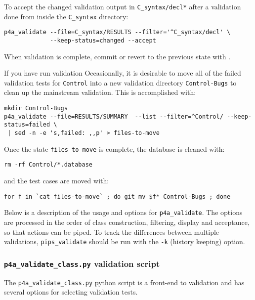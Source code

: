 \documentclass[a4paper]{article}
\begin{document}
To accept the changed validation output in \texttt{C\_syntax/decl\emph{*}}
after a validation done from inside the \verb|C_syntax| directory:
\begin{verbatim}
p4a_validate --file=C_syntax/RESULTS --filter='^C_syntax/decl' \
             --keep-status=changed --accept
\end{verbatim}
When validation is complete, commit or revert to the previous state with \Agit.

If you have run validation
Occasionally, it is desirable to move all of the failed validation tests for
\texttt{Control} into a new validation directory \texttt{Control-Bugs} to
clean up the mainstream validation. This is accomplished with:
\begin{verbatim}
mkdir Control-Bugs
p4a_validate --file=RESULTS/SUMMARY  --list --filter=^Control/ --keep-status=failed \
 | sed -n -e 's,failed: ,,p' > files-to-move
\end{verbatim}
Once the state \texttt{files-to-move} is complete, the database is
cleaned with:
\begin{verbatim}
rm -rf Control/*.database
\end{verbatim}
and the test cases are moved with:
\begin{verbatim}
for f in `cat files-to-move` ; do git mv $f* Control-Bugs ; done
\end{verbatim}


\label{sec:opti-list-p4a_v-1}

Below is a description of the usage and options for
\verb|p4a_validate|. The options are processed in the order of class
construction, filtering, display and acceptance, so that
actions can be piped. To track the differences between
multiple validations, \verb|pips_validate| should be run with the
\texttt{-k} (history keeping) option.




\subsubsection{\texttt{p4a\_validate\_class.py} validation script}
\label{sec:validation_script}

The \verb|p4a_validate_class.py| python script is a front-end to \Apfa
validation and has several options for selecting validation tests.
\end{document}
